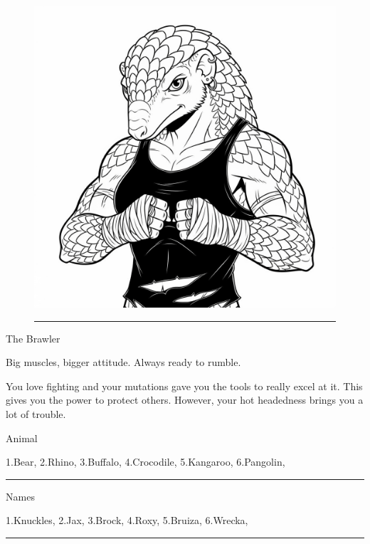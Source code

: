 \documentclass{article}
\begin{document}
\vspace*{\fill}

\begin{figure}[h!]
\centering\includegraphics[width=12cm]{images/brawler.png}
\vspace{-\baselineskip}\vspace{+0.1pt}
\rule{\linewidth}{2pt}
\end{figure}
\Huge{}The Brawler

\normalfont\normalsize
\medskip

Big muscles, bigger attitude. Always ready to rumble.

\medskip

You love fighting and your mutations gave you the tools to really excel at it. This gives you the power to protect others. However, your hot headedness brings you a lot of trouble.

\newpage

\Large{}Animal

\medskip

\normalfont\normalsize 1.Bear, 2.Rhino, 3.Buffalo, 4.Crocodile, 5.Kangaroo, 6.Pangolin, \rule{2cm}{1pt}

\Large{}Names

\medskip

\normalfont\normalsize 1.Knuckles, 2.Jax, 3.Brock, 4.Roxy, 5.Bruiza, 6.Wrecka, \rule{2cm}{1pt}
\end{document}
